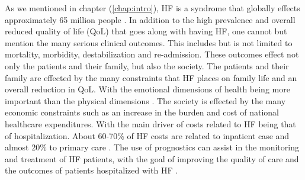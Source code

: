\documentclass[../thesis.tex]{subfiles}
\begin{document}
\noindent As we mentioned in chapter (\ref{chap:intro}), HF is a syndrome that globally effects approximately 65 million people \citep{hay2017global}. In addition to the high prevalence and overall reduced quality of life (QoL) that goes along with having HF, one cannot but mention the many serious clinical outcomes. This includes but is not limited to mortality, morbidity, destabilization and re-admission. These outcomes effect not only the patients and their family, but also the society. The patients and their family are effected by the many constraints that HF places on family life and an overall reduction in QoL. With the emotional dimensions of health being more important than the physical dimensions \citep{dunderdale2005quality}. The society is effected by the many economic constraints such as an increase in the burden and cost of national healthcare expenditures. With the main driver of costs related to HF being that of hospitalization. About 60-70\% of HF costs are related to inpatient case and almost 20\% to primary care \citep{braunwald2015war}. The use of prognostics can assist in the monitoring and treatment of HF patients, with the goal of improving the quality of care and the outcomes of patients hospitalized with HF 
\citep{tripoliti2017heart}.\\
\end{document}
